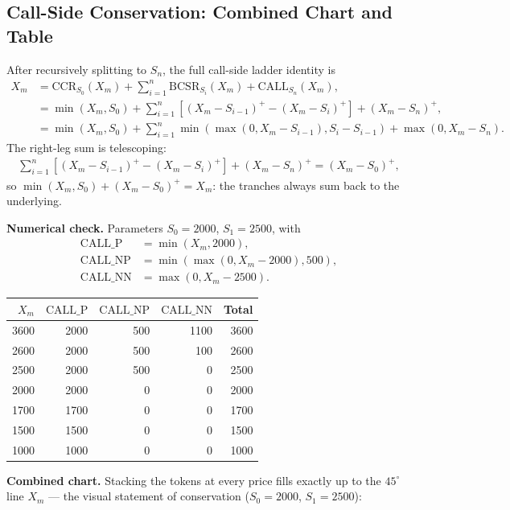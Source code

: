 \documentclass[11pt]{article}
\newcommand{\pos}[1]{\left(#1\right)^+}
\newcommand{\Call}{\mathrm{CALL}}
\newcommand{\CCR}{\mathrm{CCR}_{S_0}}
\newcommand{\BCSR}{\mathrm{BCSR}}
\newcommand{\CP}{\mathrm{CALL\_P}}
\newcommand{\CNP}{\mathrm{CALL\_NP}}
\newcommand{\CNN}{\mathrm{CALL\_NN}}
\begin{document}
\subsection{Call-Side Conservation: Combined Chart and Table}

After recursively splitting to $S_n$, the full call-side ladder identity is
\begin{align}
X_m
&=\CCR(X_m)+\sum_{i=1}^{n}\BCSR_{S_i}(X_m)+\Call_{S_n}(X_m),\\
&=\min(X_m,S_0)
+\sum_{i=1}^{n}\left[\pos{X_m-S_{i-1}}-\pos{X_m-S_i}\right]
+\pos{X_m-S_n},\\
&=\min(X_m,S_0)
+\sum_{i=1}^{n}\min\!\left(\max(0,X_m-S_{i-1}),S_i-S_{i-1}\right)
+\max(0,X_m-S_n).
\end{align}
The right-leg sum is telescoping:
\begin{align}
\sum_{i=1}^{n}\left[\pos{X_m-S_{i-1}}-\pos{X_m-S_i}\right]
+\pos{X_m-S_n}
=\pos{X_m-S_0},
\end{align}
so $\min(X_m,S_0)+\pos{X_m-S_0}=X_m$: the tranches always sum back to the underlying.

\textbf{Numerical check.} Parameters $S_0=2000$, $S_1=2500$, with
\begin{align}
\CP &=\min(X_m,2000),\\
\CNP &=\min\!\left(\max(0,X_m-2000),500\right),\\
\CNN &=\max(0,X_m-2500).
\end{align}

\begin{center}
\begin{tabular}{rrrrr}
\toprule
$X_m$ & $\CP$ & $\CNP$ & $\CNN$ & Total \\
\midrule
3600 & 2000 & 500 & 1100 & 3600 \\
2600 & 2000 & 500 & 100 & 2600 \\
2500 & 2000 & 500 & 0 & 2500 \\
2000 & 2000 & 0 & 0 & 2000 \\
1700 & 1700 & 0 & 0 & 1700 \\
1500 & 1500 & 0 & 0 & 1500 \\
1000 & 1000 & 0 & 0 & 1000 \\
\bottomrule
\end{tabular}
\end{center}

\textbf{Combined chart.} Stacking the tokens at every price fills exactly up to the
$45^\circ$ line $X_m$ --- the visual statement of conservation ($S_0=2000$, $S_1=2500$):
\end{document}
